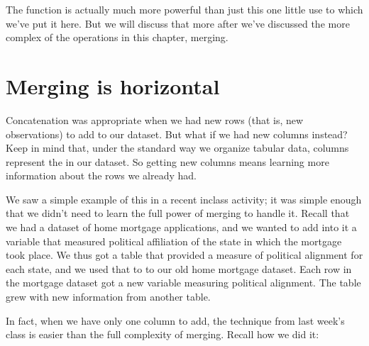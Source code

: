 \documentclass[letterpaper,10pt,english]{jupyterBook}
\begin{document}
\sphinxAtStartPar
The  function is actually much more powerful than just this one little use to which we’ve put it here.  But we will discuss that more after we’ve discussed the more complex of the operations in this chapter, merging.


\section{Merging is horizontal}
\label{\detokenize{chapter-12-concat-and-merge:merging-is-horizontal}}
\sphinxAtStartPar
Concatenation was appropriate when we had new rows (that is, new observations) to add to our dataset.  But what if we had new columns instead?  Keep in mind that, under the standard way we organize tabular data, columns represent the  in our dataset.  So getting new columns means learning more information about the rows we already had.

\sphinxAtStartPar
We saw a simple example of this in a recent in\sphinxhyphen{}class activity; it was simple enough that we didn’t need to learn the full power of merging to handle it.  Recall that we had a dataset of home mortgage applications, and we wanted to add into it a variable that measured political affiliation of the state in which the mortgage took place.  We thus got a table that provided a measure of political alignment for each state, and we used that to  to our old home mortgage dataset.  Each row in the mortgage dataset got a new variable measuring political alignment.  The table grew  with new information from another table.

\sphinxAtStartPar
In fact, when we have only one column to add, the technique from last week’s class is easier than the full complexity of merging.  Recall how we did it:

\begin{sphinxVerbatim}[commandchars=\\\{\}]
    \PYG{p}{[}\PYG{p}{]} \PYG{p}{[}\PYG{p}{]}  

\PYG{p}{[}\PYG{p}{]}  \PYG{p}{[}\PYG{p}{]}  
\end{sphinxVerbatim}
\end{document}
